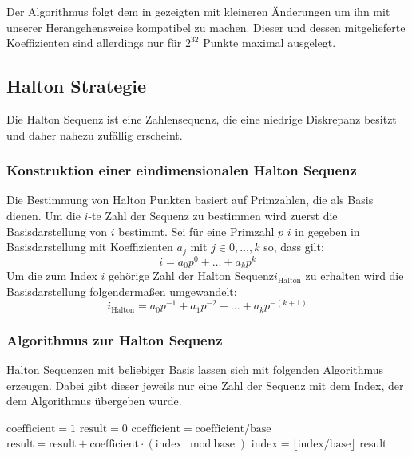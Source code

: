 \documentclass[a4paper,12pt]{llncs}
\numberwithin{equation}{section}
\begin{document}
Der Algorithmus folgt dem in \cite{JK10} gezeigten mit kleineren Änderungen um ihn mit unserer Herangehensweise kompatibel zu machen. Dieser und dessen mitgelieferte Koeffizienten sind allerdings nur für $2^{32}$ Punkte maximal ausgelegt.

\subsection{Halton Strategie}
Die Halton Sequenz ist eine Zahlensequenz, die eine niedrige Diskrepanz besitzt und daher nahezu zufällig erscheint.

\subsubsection{Konstruktion einer eindimensionalen Halton Sequenz}
Die Bestimmung von Halton Punkten basiert auf Primzahlen, die als Basis dienen. Um die $i$-te Zahl der Sequenz zu bestimmen wird zuerst die Basisdarstellung von $i$ bestimmt. Sei für eine Primzahl $p$ $i$ in gegeben in Basisdarstellung mit Koeffizienten $a_j$ mit $j\in{0,\dots,k}$ so, dass gilt:
\begin{equation}
i = a_0p^0+\dots+a_kp^k
\end{equation}
Um die zum Index $i$ gehörige Zahl der Halton Sequenz$ i_{\text{Halton}}$ zu erhalten wird die Basisdarstellung folgendermaßen umgewandelt:
\begin{equation}
i_{\text{Halton}} = a_0p^{-1}+a_1p^{-2} + \dots+a_kp^{-(k+1)}
\end{equation}

\subsubsection{Algorithmus zur Halton Sequenz}
Halton Sequenzen mit beliebiger Basis lassen sich mit folgenden Algorithmus erzeugen. Dabei gibt dieser jeweils nur eine Zahl der Sequenz mit dem Index, der dem Algorithmus übergeben wurde.

\begin{tcolorbox}
	\begin{algorithmic}
		\State $\text{coefficient} = 1$
		\State $ \text{result} = 0$
		\State $\text{coefficient} = \text{coefficient} / \text{base}$
		\State $\text{result} = \text{result} + \text{coefficient} \cdot (\text{index}\mod \text{base})$
		\State $\text{index} = \lfloor \text{index}/\text{base} \rfloor $
		\EndWhile
		\State \Return result
		\EndFunction
	\end{algorithmic}
\end{tcolorbox}
\end{document}
